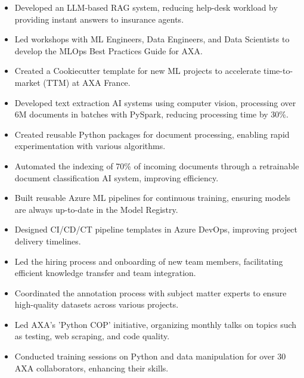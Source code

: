 \documentclass[10pt,letter,ragged2e,withhyper]{altacv}
\begin{document}
\begin{paracol}{2}



\begin{itemize}
  \item Developed an LLM-based RAG system, reducing help-desk workload by providing instant answers to insurance agents.
  \item Led workshops with ML Engineers, Data Engineers, and Data Scientists to develop the MLOps Best Practices Guide for AXA.
  \item Created a Cookiecutter template for new ML projects to accelerate time-to-market (TTM) at AXA France.
  \item Developed text extraction AI systems using computer vision, processing over 6M documents in batches with PySpark, reducing processing time by 30\%.
  \item Created reusable Python packages for document processing, enabling rapid experimentation with various algorithms.
  \item Automated the indexing of 70\% of incoming documents through a retrainable document classification AI system, improving efficiency.
  \item Built reusable Azure ML pipelines for continuous training, ensuring models are always up-to-date in the Model Registry.
  \item Designed CI/CD/CT pipeline templates in Azure DevOps, improving project delivery timelines.
  \item Led the hiring process and onboarding of new team members, facilitating efficient knowledge transfer and team integration.
  \item Coordinated the annotation process with subject matter experts to ensure high-quality datasets across various projects.
  \item Led AXA's 'Python COP' initiative, organizing monthly talks on topics such as testing, web scraping, and code quality.
  \item Conducted training sessions on Python and data manipulation for over 30 AXA collaborators, enhancing their skills.
\end{itemize}


\end{paracol}
\end{document}
